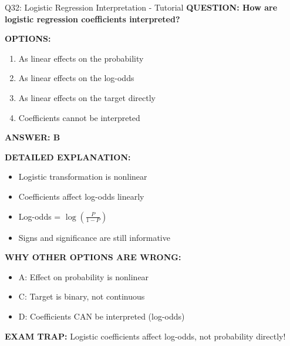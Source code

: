 \documentclass[8pt]{beamer}
\begin{document}
	\begin{frame}{Q32: Logistic Regression Interpretation - Tutorial}
		\fontsize{6.5}{7.5}\selectfont
		\textbf{QUESTION: How are logistic regression coefficients interpreted?}
		
		\vspace{0.1cm}
		\textbf{OPTIONS:}
		\begin{enumerate}
			\item As linear effects on the probability
			\item As linear effects on the log-odds
			\item As linear effects on the target directly
			\item Coefficients cannot be interpreted
		\end{enumerate}
		
		\vspace{0.1cm}
		\textcolor{myblue}{\textbf{ANSWER: B}}
		
		\vspace{0.1cm}
		\textbf{DETAILED EXPLANATION:}
		\begin{itemize}
			\item Logistic transformation is nonlinear
			\item Coefficients affect log-odds linearly
			\item Log-odds = $\log(\frac{P}{1-P})$
			\item Signs and significance are still informative
		\end{itemize}
		
		\vspace{0.1cm}
		\textcolor{myred}{\textbf{WHY OTHER OPTIONS ARE WRONG:}}
		\begin{itemize}
			\item \textcolor{myred}{A:} Effect on probability is nonlinear
			\item \textcolor{myred}{C:} Target is binary, not continuous
			\item \textcolor{myred}{D:} Coefficients CAN be interpreted (log-odds)
		\end{itemize}
		
		\textcolor{myred}{\textbf{EXAM TRAP:}} Logistic coefficients affect \textcolor{myblue}{log-odds}, not probability directly!
	\end{frame}
	
\end{document}
